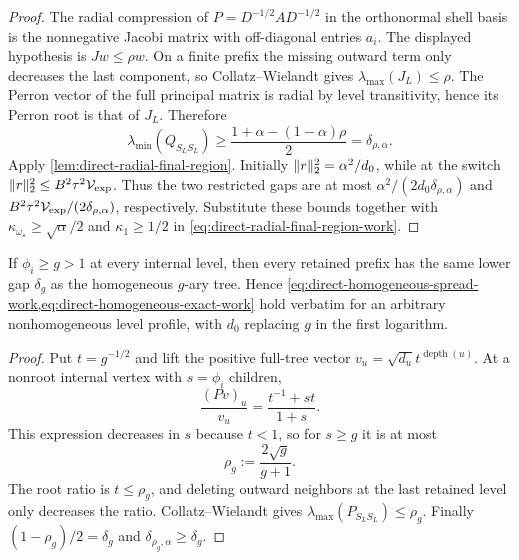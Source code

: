 \begin{proof}
The radial compression of
$P=D^{-1/2}AD^{-1/2}$ in the orthonormal shell basis is the nonnegative
Jacobi matrix with off-diagonal entries $a_i$.  The displayed hypothesis is
$Jw\leq\rho w$.  On a finite prefix the missing outward term only decreases
the last component, so Collatz--Wielandt gives
$\lambda_{\max}(J_L)\leq\rho$.  The Perron vector of the full principal
matrix is radial by level transitivity, hence its Perron root is that of
$J_L$.  Therefore
\begin{equation*}
 \lambda_{\min}(Q_{S_LS_L})
 \geq\frac{1+\alpha-(1-\alpha)\rho}{2}
 =\delta_{\rho,\alpha}.
\end{equation*}
Apply \cref{lem:direct-radial-final-region}.  Initially
$\lVert r\rVert_2^2=\alpha^2/d_0$, while at the switch
$\lVert r\rVert_2^2\leq B^2\tau^2\mathcal V_{\rm exp}$.  Thus the two restricted
gaps are at most
$\alpha^2/(2d_0\delta_{\rho,\alpha})$ and
$B^2\tau^2\mathcal V_{\rm exp}/(2\delta_{\rho,\alpha})$, respectively.
Substitute these bounds together with
$\kappa_{\omega_\star}\geq\sqrt\alpha/2$ and
$\kappa_1\geq1/2$ in
\cref{eq:direct-radial-final-region-work}.
\end{proof}

\begin{corollary}
\label{cor:direct-variable-minimum-branching}
If $\phi_i\geq g>1$ at every internal level, then every retained prefix has
the same lower gap $\delta_g$ as the homogeneous $g$-ary tree.  Hence
\cref{eq:direct-homogeneous-spread-work,eq:direct-homogeneous-exact-work}
hold verbatim for an arbitrary
nonhomogeneous level profile, with $d_0$ replacing $g$ in the first
logarithm.
\end{corollary}

\begin{proof}
Put $t=g^{-1/2}$ and lift the positive full-tree vector
$v_u=\sqrt{d_u}t^{\operatorname{depth}(u)}$.  At a nonroot internal vertex
with $s=\phi_i$ children,
\begin{equation*}
 \frac{(Pv)_u}{v_u}
 =\frac{t^{-1}+st}{1+s}.
\end{equation*}
This expression decreases in $s$ because $t<1$, so for $s\geq g$ it is at
most
\begin{equation*}
 \rho_g:=\frac{2\sqrt g}{g+1}.
\end{equation*}
The root ratio is $t\leq\rho_g$, and deleting outward neighbors at the last
retained level only decreases the ratio.  Collatz--Wielandt gives
$\lambda_{\max}(P_{S_LS_L})\leq\rho_g$.  Finally
$(1-\rho_g)/2=\delta_g$ and
$\delta_{\rho_g,\alpha}\geq\delta_g$.
\end{proof}

